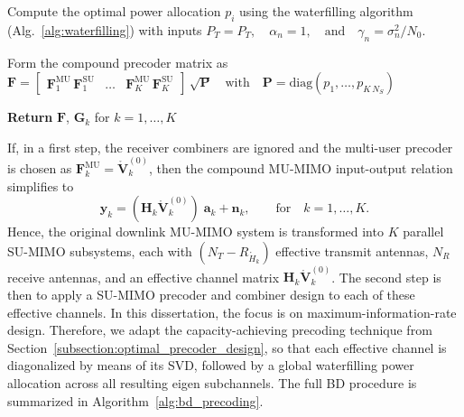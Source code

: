 \begin{algorithm}[b!]
\begin{algorithmic}[1]
    \vspace{0.4\baselineskip}
    \State Compute the optimal power allocation $p_i$ using the waterfilling algorithm (Alg.~\ref{alg:waterfilling}) with inputs
    \Statex $P_T = P_T, \quad \alpha_n = 1, \quad \text{and} \quad  \gamma_n = \sigma_n^2 / N_0.$

    \vspace{0.4\baselineskip}
    \State Form the compound precoder matrix as
    \Statex $\mathbf{F} = \begin{bmatrix} \mathbf{F}_1^{\mathrm{MU}} \, \mathbf{F}_1^{\mathrm{SU}} & \dots & \mathbf{F}_K^{\mathrm{MU}} \, \mathbf{F}_K^{\mathrm{SU}} \end{bmatrix} \, \sqrt{\mathbf{P}} \quad \text{with} \quad \mathbf{P} = \mathrm{diag}(p_1, \dots, p_{K\,N_S})$

    \medskip
    \Statex \hspace{-\algorithmicindent}\textbf{Return} \; $\mathbf{F}$, \; $\mathbf{G}_k$ for $k=1, \dots, K$

\end{algorithmic}
\end{algorithm}

If, in a first step, the receiver combiners are ignored and the multi-user precoder is chosen as $\mathbf{F}_k^{\mathrm{MU}} = \mathring{\mathbf{V}}_{k}^{(0)}$, then the compound \ac{MU}-\ac{MIMO} input-output relation simplifies to
\begin{equation}
\label{eq:bd_io_after_first_step}
    \mathbf{y}_k = (\mathbf{H}_k \mathring{\mathbf{V}}_{k}^{(0)}) \; \mathbf{a}_k + \mathbf{n}_k, \qquad \text{for} \quad k = 1, \dots, K.
\end{equation}
Hence, the original downlink \ac{MU}-\ac{MIMO} system is transformed into $K$ parallel \ac{SU}-\ac{MIMO} subsystems, each with $(N_T - R_{\mathring{H}_k})$ effective transmit antennas, $N_R$ receive antennas, and an effective channel matrix $\mathbf{H}_k \mathring{\mathbf{V}}_{k}^{(0)}$.
The second step is then to apply a \ac{SU}-\ac{MIMO} precoder and combiner design to each of these effective channels.
In this dissertation, the focus is on maximum-information-rate design. Therefore, we adapt the capacity-achieving precoding technique from Section~\ref{subsection:optimal_precoder_design}, so that each effective channel is diagonalized by means of its \ac{SVD}, followed by a global waterfilling power allocation across all resulting eigen subchannels.
The full \ac{BD} procedure is summarized in Algorithm~\ref{alg:bd_precoding}.

